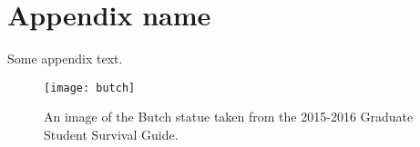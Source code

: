 \section{Appendix name}

Some appendix text. 
\begin{figure}[H] %
    \centering
    \texttt{[image: butch]}
    \caption{An image of the Butch statue taken from the 2015-2016 Graduate Student Survival Guide.}
    \label{fig:a1}
\end{figure}